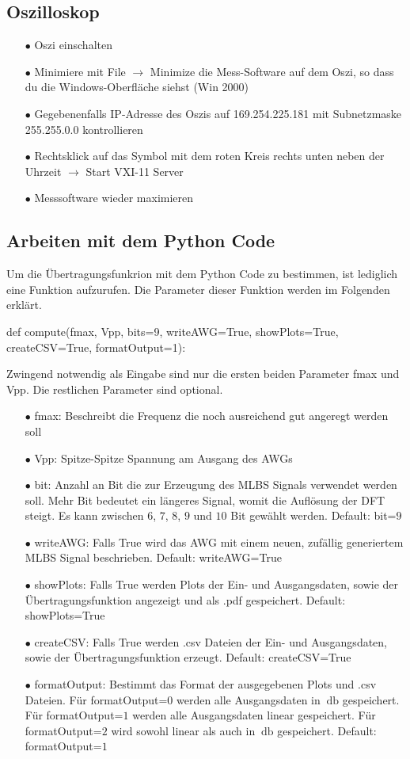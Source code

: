 \documentclass[12pt,report,final,twoside,accentcolor=tud9b,bigchapter]{tudreport}
\begin{document}
\subsection{Oszilloskop}
\begin{enumerate}
\item[$\bullet$] Oszi einschalten
\item[$\bullet$] Minimiere mit File $\rightarrow$ Minimize die
Mess-Software auf dem Oszi, so dass du die Windows-Oberfläche siehst
(Win 2000)
\item[$\bullet$] Gegebenenfalls IP-Adresse des Oszis auf 169.254.225.181
mit Subnetzmaske 255.255.0.0 kontrollieren
\item[$\bullet$] Rechtsklick auf das Symbol mit dem roten Kreis rechts
unten neben der Uhrzeit $\rightarrow$ Start VXI-11 Server
\item[$\bullet$] Messsoftware wieder maximieren
\end{enumerate}
\subsection{Arbeiten mit dem Python Code}
Um die Übertragungsfunkrion mit dem Python Code zu bestimmen, ist
lediglich eine Funktion aufzurufen. Die Parameter dieser Funktion werden im Folgenden erklärt.
\begin{python}
def compute(fmax, Vpp, bits=9, writeAWG=True, showPlots=True,
            createCSV=True, formatOutput=1):
\end{python}
Zwingend notwendig als Eingabe sind nur die ersten beiden Parameter fmax
und Vpp. Die restlichen Parameter sind optional.
\begin{enumerate}
\item[$\bullet$] fmax: Beschreibt die Frequenz die noch ausreichend gut
angeregt werden soll
\item[$\bullet$] Vpp: Spitze-Spitze Spannung am Ausgang des AWGs
\item[$\bullet$] bit: Anzahl an Bit die zur Erzeugung des MLBS Signals
verwendet werden soll. Mehr Bit bedeutet ein längeres Signal, womit die
Auflösung der DFT steigt. Es kann zwischen $6$, $7$, $8$, $9$ und $10$
Bit gewählt werden. Default: bit=$9$
\item[$\bullet$] writeAWG: Falls True wird das AWG mit einem neuen,
zufällig generiertem MLBS Signal beschrieben. Default: writeAWG=True
\item[$\bullet$] showPlots: Falls True werden Plots der Ein- und
Ausgangsdaten, sowie der Übertragungsfunktion angezeigt und als .pdf
gespeichert. Default: showPlots=True
\item[$\bullet$] createCSV: Falls True werden .csv Dateien der Ein- und
Ausgangsdaten, sowie der Übertragungsfunktion erzeugt. Default:
createCSV=True
\item[$\bullet$] formatOutput: Bestimmt das Format der ausgegebenen
Plots und .csv Dateien. Für formatOutput=$0$ werden alle Ausgangsdaten
in $\SI{}{\decibel}$ gespeichert. Für formatOutput=$1$ werden alle
Ausgangsdaten linear gespeichert. Für formatOutput=$2$ wird sowohl
linear als auch in $\SI{}{\decibel}$ gespeichert. Default: formatOutput=$1$
\end{enumerate}
\end{document}
